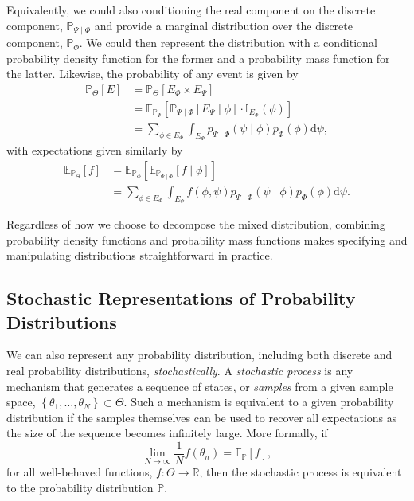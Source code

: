 \documentclass[11pt, oneside]{article}
\newcommand{\dd}{ \mathrm{d} }
\newcommand{\PP}{ \mathbb{P} }
\newcommand{\EE}{ \mathbb{E} }
\newcommand{\RR}{ \mathbb{R} }
\begin{document}
Equivalently, we could also conditioning the real component on the
discrete component, $\PP_{\Psi \mid \Phi}$ and provide a marginal 
distribution over the discrete component, $\PP_{\Phi}$.  We could 
then represent the distribution with a conditional probability density 
function for the former and a probability mass function for the latter.  
Likewise, the probability of any event is given by
%
\begin{align*}
\PP_{\Theta} \! \left[ E \right]
&=
\PP_{\Theta} \! \left[ E_{\Phi} \times E_{\Psi} \right]
\\
&=
\EE_{\PP_{\Phi}} \! \left[
\PP_{\Psi \mid \Phi} \! \left[  E_{\Psi} \mid \phi \right]
\cdot
\mathbb{I}_{E_{\Phi}} \! \left( \phi \right)
\right] 
\\
&= 
\sum_{\phi \in E_{\Phi} } \int_{E_{\Psi} }
p_{\Psi \mid \Phi} \! \left( \psi \mid \phi \right) 
p_{\Phi} \! \left( \phi \right) \dd \psi,
\end{align*}
%
with expectations given similarly by
%
\begin{align*}
\EE_{\PP_{\Theta}} \! \left[ f \right]
&=
\EE_{\PP_{\Phi}} \! \left[
\EE_{\PP_{\Psi \mid \Phi}} \! \left[  f \mid \phi \right]
\right] 
\\
&= 
\sum_{\phi \in E_{\Phi} } \int_{E_{\Psi} }
f \! \left( \phi, \psi \right) 
p_{\Psi \mid \Phi} \! \left( \psi \mid \phi \right)
p_{\Phi} \! \left( \phi \right) \dd \psi.
\end{align*}

Regardless of how we choose to decompose the mixed distribution,
combining probability density functions and probability mass functions
makes specifying and manipulating distributions straightforward in
practice.

\subsection{Stochastic Representations of Probability Distributions}

We can also represent any probability distribution, including both
discrete and real probability distributions, \emph{stochastically}.  
A \emph{stochastic process} is any mechanism that generates a 
sequence of states, or \emph{samples} from a given sample space, 
$\left\{ \theta_{1}, \ldots, \theta_{N} \right\} \subset \Theta$.  Such a 
mechanism is equivalent to a given probability distribution if the 
samples themselves can be used to recover all expectations as 
the size of the sequence becomes infinitely large. More formally, 
if
%
\begin{equation*}
\lim_{N \rightarrow \infty} \frac{1}{N} f \! \left( \theta_{n} \right)
= \EE_{\PP} \! \left[ f \right],
\end{equation*}
%
for all well-behaved functions, $f : \Theta \rightarrow \RR$, then the 
stochastic process is equivalent to the probability distribution $\PP$.
\end{document}
